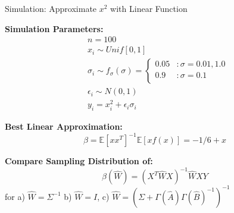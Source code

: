 \documentclass[12pt]{beamer}
\newcommand{\E}{\mathbb{E}}
\begin{document}




\begin{frame}{Simulation: Approximate $x^2$ with Linear Function}

  \textbf{Simulation Parameters:}
  \begin{align*}
        &n=100\\
        &x_i \sim Unif[0,1]\\
        &\sigma_i \sim f_{\sigma}(\sigma) = \left\{
          \begin{array}{lr}
            0.05 \! &:  \! \sigma=0.01,1.0\\ 
            0.9  \! &: \! \sigma=0.1\\
          \end{array} \right.\\
        &\epsilon_i \sim N(0,1)\\
        &y_i = x_i^2 + \epsilon_i\sigma_i
  \end{align*}

  \textbf{Best Linear Approximation:}
  \begin{equation*}
      \beta = \E[xx^T]^{-1}\E[xf(x)] = -1/6 + x
  \end{equation*}

  \textbf{Compare Sampling Distribution of:}
  \begin{equation*}
    \widehat{\beta}(\widehat{W}) = (X^T\widehat{W}X)^{-1}\widehat{W}XY
  \end{equation*}
  for  \hfill a)  $\widehat{W}=\Sigma^{-1}$ \hfill b)   $\widehat{W} = I$,  \hfill c)   $\widehat{W} = (\Sigma + \Gamma(\widehat{A})\Gamma(\widehat{B})^{-1})^{-1}$
  
  
\end{frame}
\end{document}
